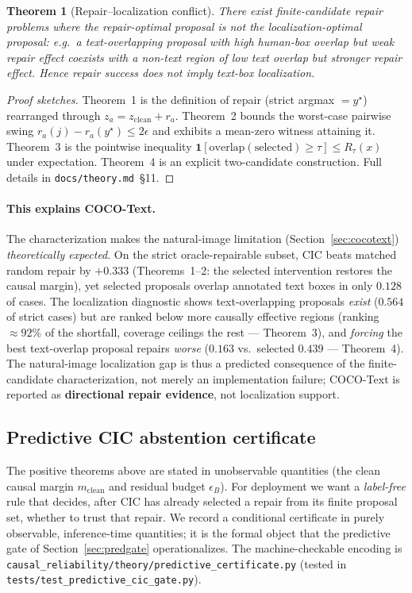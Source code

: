 \documentclass[11pt]{article}
\newtheorem{theorem}{Theorem}
\begin{document}
\begin{theorem}[Repair--localization conflict]
There exist finite-candidate repair problems where the repair-optimal proposal is not
the localization-optimal proposal: e.g.\ a text-overlapping proposal with high human-box
overlap but weak repair effect coexists with a non-text region of low text overlap but
stronger repair effect. Hence repair success does not imply text-box localization.
\end{theorem}
\begin{proof}[Proof sketches]
Theorem~1 is the definition of repair (strict argmax $=y^\star$) rearranged through
$z_a=z_{\mathrm{clean}}+r_a$. Theorem~2 bounds the worst-case pairwise swing
$r_a(j)-r_a(y^\star)\le 2\epsilon$ and exhibits a mean-zero witness attaining it.
Theorem~3 is the pointwise inequality $\mathbf{1}[\mathrm{overlap}(\mathrm{selected})\ge\tau]
\le R_\tau(x)$ under expectation. Theorem~4 is an explicit two-candidate construction.
Full details in \texttt{docs/theory.md}~\S11.
\end{proof}

\paragraph{This explains COCO-Text.} The characterization makes the natural-image
limitation (Section~\ref{sec:cocotext}) \emph{theoretically expected}. On the strict
oracle-repairable subset, CIC beats matched random repair by $+0.333$ (Theorems~1--2:
the selected intervention restores the causal margin), yet selected proposals overlap
annotated text boxes in only $0.128$ of cases. The localization diagnostic shows
text-overlapping proposals \emph{exist} ($0.564$ of strict cases) but are ranked below
more causally effective regions (ranking $\approx 92\%$ of the shortfall, coverage
ceilings the rest --- Theorem~3), and \emph{forcing} the best text-overlap proposal
repairs \emph{worse} ($0.163$ vs.\ selected $0.439$ --- Theorem~4). The natural-image
localization gap is thus a predicted consequence of the finite-candidate
characterization, not merely an implementation failure; COCO-Text is reported as
\textbf{directional repair evidence}, not localization support.

\subsection{Predictive CIC abstention certificate}
\label{sec:predcert}
The positive theorems above are stated in unobservable quantities (the clean causal
margin $m_{\mathrm{clean}}$ and residual budget $\epsilon_B$). For deployment we want
a \emph{label-free} rule that decides, after CIC has already selected a repair from its
finite proposal set, whether to trust that repair. We record a conditional certificate
in purely observable, inference-time quantities; it is the formal object that the
predictive gate of Section~\ref{sec:predgate} operationalizes. The machine-checkable
encoding is \texttt{causal\_reliability/theory/predictive\_certificate.py} (tested in
\texttt{tests/test\_predictive\_cic\_gate.py}).
\end{document}

